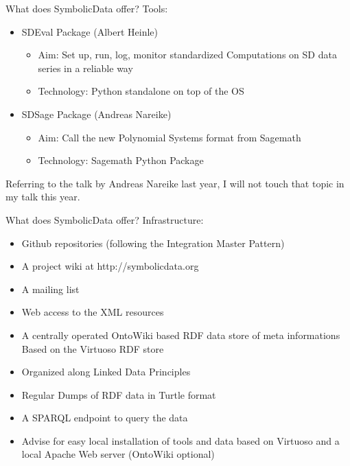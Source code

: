 \documentclass{beamer}
\begin{document}
\begin{frame}{What does SymbolicData offer?}{}
{Tools:}
\begin{itemize}
\item SDEval Package (Albert Heinle)
\begin{itemize}
\item Aim: Set up, run, log, monitor standardized Computations on SD data
  series in a reliable way 
\item Technology: Python standalone on top of the OS
\end{itemize}
\item SDSage Package (Andreas Nareike)
\begin{itemize}
\item Aim: Call the new Polynomial Systems format from Sagemath 
\item Technology: Sagemath Python Package
\end{itemize}
\end{itemize}
Referring to the talk by Andreas Nareike last year, I will not touch that
topic in my talk this year.
\end{frame}

\begin{frame}{What does SymbolicData offer?}{}
{Infrastructure:}
\begin{itemize}
\item Github repositories (following the Integration Master Pattern)
\item A project wiki at http://symbolicdata.org
\item A mailing list
\item Web access to the XML resources
\item A centrally operated OntoWiki based RDF data store of meta informations
  Based on the Virtuoso RDF store
\item Organized along Linked Data Principles
\item Regular Dumps of RDF data in Turtle format
\item A SPARQL endpoint to query the data
\item Advise for easy local installation of tools and data based on Virtuoso
  and a local Apache Web server (OntoWiki optional)
\end{itemize}
\end{frame}
\end{document}
